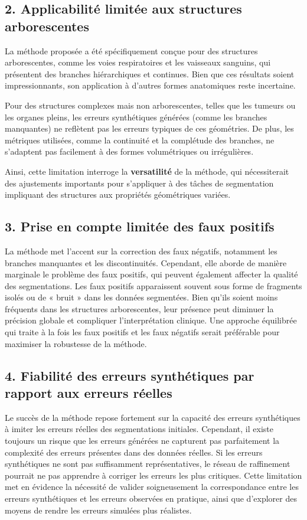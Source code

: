 \documentclass[a4paper,12pt]{article}
\begin{document}
\begin{multicols}{2}
\subsection*{2. Applicabilité limitée aux structures arborescentes}

La méthode proposée a été spécifiquement conçue pour des structures arborescentes, comme les voies respiratoires et les vaisseaux sanguins, qui présentent des branches hiérarchiques et continues. Bien que ces résultats soient impressionnants, son application à d’autres formes anatomiques reste incertaine.

Pour des structures complexes mais non arborescentes, telles que les tumeurs ou les organes pleins, les erreurs synthétiques générées (comme les branches manquantes) ne reflètent pas les erreurs typiques de ces géométries. De plus, les métriques utilisées, comme la continuité et la complétude des branches, ne s’adaptent pas facilement à des formes volumétriques ou irrégulières.

Ainsi, cette limitation interroge la \textbf{versatilité} de la méthode, qui nécessiterait des ajustements importants pour s’appliquer à des tâches de segmentation impliquant des structures aux propriétés géométriques variées.


\subsection*{3. Prise en compte limitée des faux positifs} 

La méthode met l’accent sur la correction des faux négatifs, notamment les branches manquantes et les discontinuités. Cependant, elle aborde de manière marginale le problème des faux positifs, qui peuvent également affecter la qualité des segmentations. Les faux positifs apparaissent souvent sous forme de fragments isolés ou de « bruit » dans les données segmentées. Bien qu’ils soient moins fréquents dans les structures arborescentes, leur présence peut diminuer la précision globale et compliquer l’interprétation clinique. Une approche équilibrée qui traite à la fois les faux positifs et les faux négatifs serait préférable pour maximiser la robustesse de la méthode.

\subsection*{4. Fiabilité des erreurs synthétiques par rapport aux erreurs réelles}
Le succès de la méthode repose fortement sur la capacité des erreurs synthétiques à imiter les erreurs réelles des segmentations initiales. Cependant, il existe toujours un risque que les erreurs générées ne capturent pas parfaitement la complexité des erreurs présentes dans des données réelles. Si les erreurs synthétiques ne sont pas suffisamment représentatives, le réseau de raffinement pourrait ne pas apprendre à corriger les erreurs les plus critiques. Cette limitation met en évidence la nécessité de valider soigneusement la correspondance entre les erreurs synthétiques et les erreurs observées en pratique, ainsi que d’explorer des moyens de rendre les erreurs simulées plus réalistes.


\end{multicols}
\end{document}
